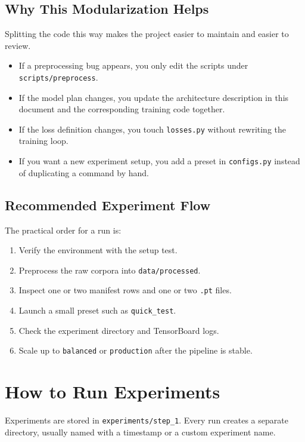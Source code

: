 \documentclass[11pt]{article}
\newcommand{\pathtt}[1]{\texttt{#1}}
\begin{document}
\subsection{Why This Modularization Helps}

Splitting the code this way makes the project easier to maintain and easier to review.

\begin{itemize}[leftmargin=1.5em]
  \item If a preprocessing bug appears, you only edit the scripts under \pathtt{scripts/preprocess}.
  \item If the model plan changes, you update the architecture description in this document and the corresponding training code together.
  \item If the loss definition changes, you touch \pathtt{losses.py} without rewriting the training loop.
  \item If you want a new experiment setup, you add a preset in \pathtt{configs.py} instead of duplicating a command by hand.
\end{itemize}

\subsection{Recommended Experiment Flow}

The practical order for a run is:

\begin{enumerate}[leftmargin=1.5em]
  \item Verify the environment with the setup test.
  \item Preprocess the raw corpora into \pathtt{data/processed}.
  \item Inspect one or two manifest rows and one or two \pathtt{.pt} files.
  \item Launch a small preset such as \pathtt{quick\_test}.
  \item Check the experiment directory and TensorBoard logs.
  \item Scale up to \pathtt{balanced} or \pathtt{production} after the pipeline is stable.
\end{enumerate}

\section{How to Run Experiments}

Experiments are stored in \pathtt{experiments/step\_1}. Every run creates a separate directory, usually named with a timestamp or a custom experiment name.
\end{document}
